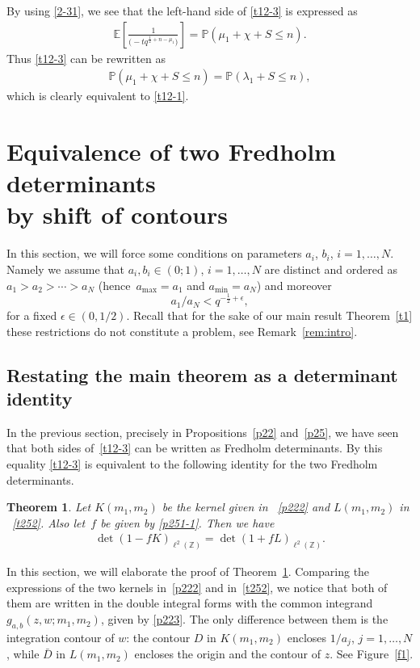 \documentclass[11pt]{article}
\numberwithin{equation}{section}
\numberwithin{equation}{section}
\newtheorem{Theorem}{Theorem}[section]
\newcommand{\E}[1]{\widetilde{e}_{#1}}
\def\e{\epsilon}
\def\E{\mathbb{E}}
\def\l{\lambda}
\def\P{\mathbb{P}}
\def\Z{\mathbb{Z}}
\begin{document}
 By using \eqref{2-31}, we see that
 the left-hand side of \eqref{t12-3}
 is expressed as
 \begin{align*}
 \E
 \left[ \frac{1}{\bigl(-t q^{\frac12+n-\mu_1}\bigr)}\right]
 =\P(\mu_1+\chi+S\le n).
 \end{align*}
 Thus \eqref{t12-3} can be rewritten as
 \begin{align*}%
 \P(\mu_1+\chi+S\le n)
 =
 \P(\l_1+S\le n),
 \end{align*}
 which is clearly equivalent to \eqref{t12-1}.

\section[Equivalence of two Fredholm determinants by shift of contours]{Equivalence of two Fredholm determinants\\ by shift of contours} \label{s3}

In this section, we will force some conditions on parameters $a_i$, $b_i$,
$i=1,\dots,N$. Namely we assume that $a_i,b_i\in (0;1)$, $i=1,\dots,N $ are distinct and ordered as $a_1>a_2>\cdots > a_N$ (hence~${a_{\max}=a_1}$ and $a_{\min}=a_N$)
and moreover
\[
 a_{1}/a_{N}<q^{-\frac12+\e},
\]
for a fixed $\e \in (0,1/2)$. Recall that for the sake of our main result Theorem~\ref{t1} these restrictions do not constitute a problem, see Remark~\ref{rem:intro}.


\subsection{Restating the main theorem as a determinant identity}
\label{s31}
In the previous section, precisely in Propositions~\ref{p22} and~\ref{p25}, we have seen that both sides of~\eqref{t12-3} can be written as Fredholm determinants. By this equality \eqref{t12-3} is equivalent to the following identity for the two Fredholm determinants.
\begin{Theorem}
\label{t31}
Let $K(m_1,m_2)$ be the kernel given in ~\eqref{p222} and $L(m_1,m_2)$ in ~\eqref{t252}.
Also let~$f$ be given by \eqref{p251-1}.
Then we have
\begin{align}
\label{31}
\det(1-f K)_{\ell^2(\Z)}
=
\det(1+fL)_{\ell^2(\Z)}.
\end{align}
\end{Theorem}
In this section, we will elaborate the proof of Theorem~\ref{t31}.
Comparing the expressions of the two kernels in~\eqref{p222} and in~\eqref{t252}, we notice that both of them are written in the double integral forms with the common integrand $g_{a,b}(z,w;m_1,m_2)$, given by \eqref{p223}. The only difference between them is the integration contour of $w$: the contour $D$ in $K(m_1,m_2)$ encloses $1/a_j$, $j=1,\dots,N$, while $\bar{D}$ in $L(m_1,m_2)$ encloses the origin and the contour of $z$. See Figure~\ref{f1}.
\end{document}
